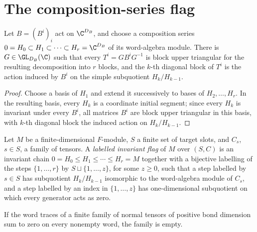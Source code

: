 \section{The composition-series flag}%
\label{sec:asym_flag}

\begin{lemma}
    \label{lem:asym_composition_gauge}
    \leanok
    Let $B=(B^i)_i$ act on $\C^{D_B}$, and choose a composition series
    $0=H_0\subset H_1\subset\cdots\subset H_r=\C^{D_B}$ of its
    word-algebra module. There is $G\in\GL_{D_B}(\C)$ such that every
    $T^i=GB^iG^{-1}$ is block upper triangular for the resulting
    decomposition into $r$ blocks, and the $k$-th diagonal block of $T^i$
    is the action induced by $B^i$ on the simple subquotient
    $H_k/H_{k-1}$.
\end{lemma}

\begin{proof}
    \leanok
    Choose a basis of $H_1$ and extend it successively to bases of
    $H_2,\ldots,H_r$. In the resulting basis, every $H_k$ is a coordinate
    initial segment; since every $H_k$ is invariant under every $B^i$, all
    matrices $B^i$ are block upper triangular in this basis, with $k$-th
    diagonal block the induced action on $H_k/H_{k-1}$.
\end{proof}

\begin{definition}
    \label{def:asym_flag_data}
    \leanok
    Let $M$ be a finite-dimensional $F$-module, $S$ a finite set of target
    slots, and $C_s$, $s\in S$, a family of tensors. A \emph{labelled
        invariant flag} of $M$ over $(S,C)$ is an invariant chain
    $0=H_0\leq H_1\leq\cdots\leq H_r=M$ together with a bijective labelling
    of the steps $\{1,\ldots,r\}$ by $S\sqcup\{1,\ldots,z\}$, for some
    $z\geq0$, such that a step labelled by $s\in S$ has subquotient
    $H_k/H_{k-1}$ isomorphic to the word-algebra module of $C_s$, and a
    step labelled by an index in $\{1,\ldots,z\}$ has one-dimensional
    subquotient on which every generator acts as zero.
\end{definition}

\begin{lemma}
    \label{lem:asym_flag_base_case}
    \leanok
    If the word traces of a finite family of normal tensors of positive
    bond dimension sum to zero on every nonempty word, the family is
    empty.
\end{lemma}

